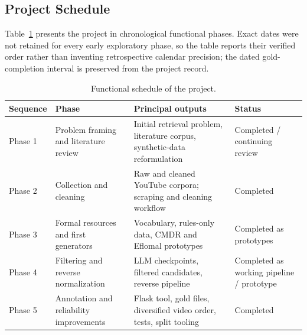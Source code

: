 \documentclass[12pt, a4paper, twoside, openany]{report}
\begin{document}
\subsection{Project Schedule}

Table~\ref{tab:project-schedule} presents the project in chronological functional phases. Exact dates were not retained for every early exploratory phase, so the table reports their verified order rather than inventing retrospective calendar precision; the dated gold-completion interval is preserved from the project record.

\begin{table}[H]
	\centering
	\caption{Functional schedule of the project.}
	\label{tab:project-schedule}
	\scriptsize
	\renewcommand{\arraystretch}{1.2}
	\begin{tabularx}{\textwidth}{
			>{\raggedright\arraybackslash}p{2.4cm}
			>{\raggedright\arraybackslash}p{3.2cm}
			>{\raggedright\arraybackslash}X
			>{\raggedright\arraybackslash}p{2.7cm}
		}
		\toprule
		\textbf{Sequence} &
		\textbf{Phase} &
		\textbf{Principal outputs} &
		\textbf{Status} \\
		\midrule

		Phase 1 &
		Problem framing and literature review &
		Initial retrieval problem, literature corpus, synthetic-data reformulation &
		Completed / continuing review \\

		\addlinespace

		Phase 2 &
		Collection and cleaning &
		Raw and cleaned YouTube corpora; scraping and cleaning workflow &
		Completed \\

		\addlinespace

		Phase 3 &
		Formal resources and first generators &
		Vocabulary, rules-only data, CMDR and Eflomal prototypes &
		Completed as prototypes \\

		\addlinespace

		Phase 4 &
		Filtering and reverse normalization &
		LLM checkpoints, filtered candidates, reverse pipeline &
		Completed as working pipeline / prototype \\

		\addlinespace

		Phase 5 &
		Annotation and reliability improvements &
		Flask tool, gold files, diversified video order, tests, split tooling &
		Completed \\


\end{tabularx}
\end{table}
\end{document}
